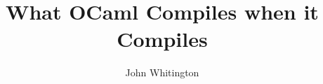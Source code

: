 \documentclass[10pt]{article}
\begin{document}
\title{What OCaml Compiles when it Compiles}
\author{John Whitington}
\maketitle
\end{document}

